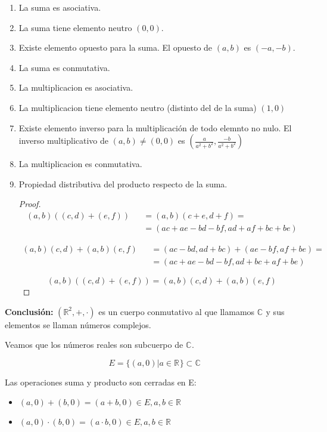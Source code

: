 \begin{enumerate}
  \item La suma es asociativa.
  \item La suma tiene elemento neutro \((0,0)\).
  \item Existe elemento opuesto para la suma. El opuesto de \((a,b)\) es \((-a,-b)\).
  \item La suma es conmutativa.
  \item La multiplicacion es asociativa.
  \item La multiplicacion tiene elemento neutro (distinto del de la suma) \((1,0)\)
  \item Existe elemento inverso para la multiplicación de todo elemnto no nulo. El inverso multiplicativo de \((a,b) \neq (0,0)\) es \((\frac{a}{a^2+b^2},\frac{-b}{a^2+b^2})\)
  \item La multiplicacion es conmutativa.
  \item Propiedad distributiva del producto respecto de la suma.
    \begin{proof}
      \begin{eqnarray*}
        (a,b)((c,d)+(e,f)) & & = (a,b)(c+e,d+f) = \\
                           & & = (ac+ae-bd-bf,ad+af+bc+be)
      \end{eqnarray*}

      \begin{eqnarray*}
        (a,b)(c,d)+(a,b)(e,f) & & = (ac-bd,ad+bc)+(ae-bf,af+be) = \\
                              & & = (ac+ae-bd-bf, ad+bc+af+be)
      \end{eqnarray*}

      \[(a,b)((c,d)+(e,f)) = (a,b)(c,d)+(a,b)(e,f)\]
    \end{proof}
\end{enumerate}

\textbf{Conclusión:} \((\mathbb{R}^{2},+,\cdot)\) es un cuerpo conmutativo al que llamamos \(\mathbb{C}^{}\) y sus elementos se llaman números complejos.

Veamos que los números reales son subcuerpo de \(\mathbb{C}^{}\).

\[ E= \{(a,0) | a \in \mathbb{R}^{}\} \subset \mathbb{C}^{}\]

Las operaciones suma y producto son cerradas en E:

\begin{itemize}
  \item \((a,0) + (b,0) = (a+b, 0) \in E, a,b \in \mathbb{R}^{}\)
  \item \((a,0)\cdot(b,0) = (a\cdot b, 0) \in E, a,b \in \mathbb{R}^{}\)
\end{itemize}

